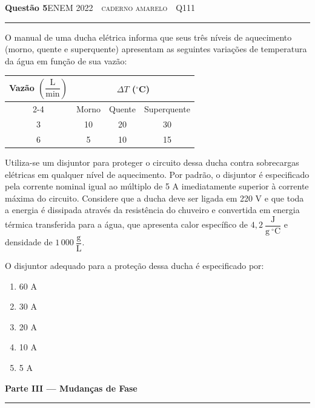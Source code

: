 \documentclass[11pt,a4paper]{article}
\newcommand{\fonte}[1]{{\small\scshape\color{grafite}#1}}
\newenvironment{questao}[2]{%
  \needspace{6\baselineskip}
  \par\addvspace{1.6em}
  {\large\bfseries\color{vinho}Quest\~ao #1}\hfill #2\\[-0.55em]
  {\color{black!25}\rule{\linewidth}{0.4pt}}
  \par\nobreak\smallskip
}{\par\addvspace{0.4em}}
\newcommand{\parte}[1]{%
  \needspace{7\baselineskip}
  \vspace{1.8em}
  {\Large\bfseries #1}\\[-0.55em]
  {\color{black!30}\rule{\linewidth}{0.5pt}}
  \par\nobreak\smallskip
}
\begin{document}
\begin{questao}{5}{\fonte{ENEM 2022 \,\textperiodcentered\, caderno amarelo \,\textperiodcentered\, Q111}}
O manual de uma ducha el\'etrica informa que seus tr\^es n\'iveis de
aquecimento (morno, quente e superquente) apresentam as seguintes
varia\c{c}\~oes de temperatura da \'agua em fun\c{c}\~ao de sua vaz\~ao:

\begin{center}
{\renewcommand{\arraystretch}{1.4}
\begin{tabular}{@{}cccc@{}}
  \toprule
  \multirow{2}{*}{Vaz\~ao $\left(\dfrac{\mathrm{L}}{\mathrm{min}}\right)$}
    & \multicolumn{3}{c}{$\Delta T$ ($^\circ$C)} \\
  \cmidrule(l){2-4}
    & Morno & Quente & Superquente \\
  \midrule
  3 & 10 & 20 & 30 \\
  6 & 5  & 10 & 15 \\
  \bottomrule
\end{tabular}}
\end{center}

Utiliza-se um disjuntor para proteger o circuito dessa ducha contra
sobrecargas el\'etricas em qualquer n\'ivel de aquecimento. Por padr\~ao, o
disjuntor \'e especificado pela corrente nominal igual ao m\'ultiplo de
5 A imediatamente superior \`a corrente m\'axima do circuito. Considere que
a ducha deve ser ligada em 220 V e que toda a energia \'e dissipada
atrav\'es da resist\^encia do chuveiro e convertida em energia t\'ermica
transferida para a \'agua, que apresenta calor espec\'ifico de
$4{,}2\ \dfrac{\mathrm{J}}{\mathrm{g}\ ^\circ\mathrm{C}}$ e densidade de
$1\,000\ \dfrac{\mathrm{g}}{\mathrm{L}}$.

O disjuntor adequado para a prote\c{c}\~ao dessa ducha \'e especificado por:
\begin{enumerate}
  \item 60 A
  \item 30 A
  \item 20 A
  \item 10 A
  \item 5 A
\end{enumerate}
\end{questao}

\parte{Parte III --- Mudan\c{c}as de Fase}
\end{document}
